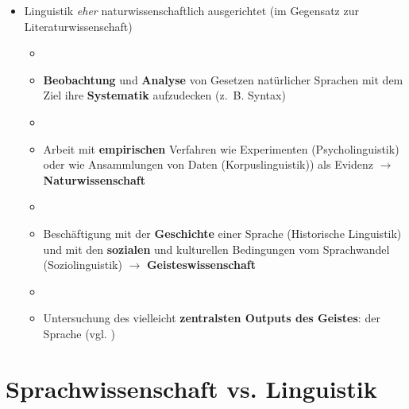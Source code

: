\begin{frame}

	\begin{itemize}
		\item Linguistik \textit{eher} naturwissenschaftlich ausgerichtet (im Gegensatz zur Literaturwissenschaft)
		
		\begin{itemize}
			\item[]
			\item \textbf{Beobachtung} und \textbf{Analyse} von Gesetzen natürlicher Sprachen mit dem Ziel ihre \textbf{Systematik} aufzudecken (z.~B. Syntax)
			\item[]
			\item<2-> Arbeit mit \textbf{empirischen} Verfahren wie Experimenten (\zB Psycholinguistik) oder wie Ansammlungen von Daten (\zB Korpuslinguistik)) als Evidenz $\rightarrow$ \textbf{Naturwissenschaft}
			\item[]
			\item<3-> Beschäftigung mit der \textbf{Geschichte} einer Sprache (\zB Historische Linguistik) und mit den \textbf{sozialen} und kulturellen Bedingungen vom Sprachwandel (\zB Soziolinguistik) $\rightarrow$ \textbf{Geisteswissenschaft}
			\item[]
			\item<4-> Untersuchung des vielleicht \textbf{zentralsten Outputs des Geistes}: der Sprache (vgl. \citet{Meibauer&Co07a})
		\end{itemize}
		
	\end{itemize}
	
\end{frame}		


%
\section{Sprachwissenschaft vs. Linguistik}

